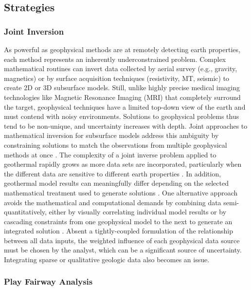 \subsection{Strategies}
\subsubsection{Joint Inversion}

As powerful as geophysical methods are at remotely detecting earth properties, each method represents an inherently underconstrained problem. Complex mathematical routines can invert data collected by aerial survey (e.g., gravity, magnetics) or by surface acquisition techniques (resistivity, MT, seismic) to create 2D or 3D subsurface models. Still, unlike highly precise medical imaging technologies like Magnetic Resonance Imaging (MRI) that completely surround the target, geophysical techniques have a limited top-down view of the earth and must contend with noisy environments. Solutions to geophysical problems thus tend to be non-unique, and uncertainty increases with depth. Joint approaches to mathematical inversion for subsurface models address this ambiguity by constraining solutions to match the observations from multiple geophysical methods at once \citep{vozoff_joint_1975}. The complexity of a joint inverse problem applied to geothermal rapidly grows as more data sets are incorporated, particularly when the different data are sensitive to different earth properties \citep{moorkamp_framework_2011}. In addition, geothermal model results can meaningfully differ depending on the selected mathematical treatment used to generate solutions \citep{rosenkjaer_comparison_2015}. One alternative approach avoids the mathematical and computational demands by combining data semi-quantitatively, either by visually correlating individual model results or by cascading constraints from one geophysical model to the next to generate an integrated solution \citep{jousset_hengill_2011, lichoro_joint_2019}. Absent a tightly-coupled formulation of the relationship between all data inputs, the weighted influence of each geophysical data source must be chosen by the analyst, which can be a significant source of uncertainty. Integrating sparse or qualitative geologic data also becomes an issue.

\subsubsection{Play Fairway Analysis}

